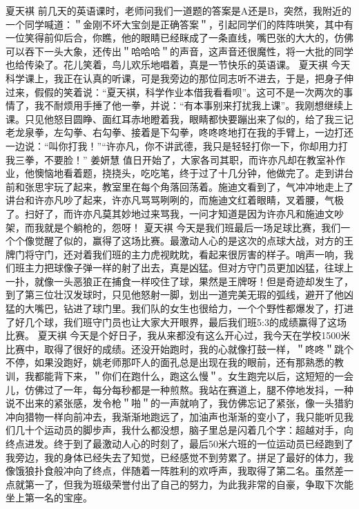 {}夏天褀\markdownRendererInterblockSeparator
{}前几天的英语课时，老师问我们一道题的答案是A还是B，突然，我附近的一个同学喊道：＂金刚不坏大宝剑是正确答案＂，引起同学们的阵阵哄笑，其中有一位笑得前仰后合，你瞧，他的眼睛已经眯成了一条直线，嘴巴张的大大的，仿佛可以吞下一头大象，还传出＂哈哈哈＂的声音，这声音还很魔性，将一大批的同学也给传染了。花儿笑着，鸟儿欢乐地唱着，真是一节快乐的英语课。\markdownRendererInterblockSeparator
{}\markdownRendererInterblockSeparator
{}夏天褀\markdownRendererInterblockSeparator
{}今天科学课上，我正在认真的听课，可是我旁边的那位同志听不进去，于是，把身子伸过来，假假的笑着说：“夏天褀，科学作业本借我看看呗”。这可不是一次两次的事情了，我不耐烦用手捶了他一拳，并说：“有本事别来打扰我上课”。我刚想继续上课。只见他怒目圆睁、面红耳赤地瞪着我，眼睛都快要蹦出来了似的，给了我三记老龙泉拳，左勾拳、右勾拳、接着是下勾拳，咚咚咚地打在我的手臂上，一边打还一边说：“叫你打我！”“许亦凡，你不讲武德，我只是轻轻打你一下，你却用力打我三拳，不要脸！”\markdownRendererInterblockSeparator
{}\markdownRendererInterblockSeparator
{}姜妍慧\markdownRendererInterblockSeparator
{}值日开始了，大家各司其职，而许亦凡却在教室补作业，他懊恼地看着题，挠挠头，吃吃笔，终于过了十几分钟，他做完了。走到讲台前和张思宇玩了起来，教室里在每个角落回荡着。施迪文看到了，气冲冲地走上了讲台和许亦凡吵了起来，许亦凡骂骂咧咧的，而施迪文红着眼睛，叉着腰，气极了。扫好了，而许亦凡莫其妙地过来骂我，一问才知道是因为许亦凡和施迪文吵架，而我就是个躺枪的，怨呀！\markdownRendererInterblockSeparator
{}\markdownRendererInterblockSeparator
{}夏天褀\markdownRendererInterblockSeparator
{}今天是我们班最后一场足球比赛，我们一个个像觉醒了似的，赢得了这场比赛。最激动人心的是这次的点球大战，对方的王牌门将守门，还对着我们班的主力虎视眈眈，看起来很厉害的样子。哨声一响，我们班主力把球像子弹一样的射了出去，真是凶猛。但对方守门员更加凶猛，往球上一扑，就像一头恶狼正在捕食一样咬住了球，果然是王牌呀！但是奇迹却发生了，到了第三位壮汉发球时，只见他怒射一脚，划出一道完美无瑕的弧线，避开了他凶猛的大嘴巴，钻进了球门里。我们队的女生也很给力，一个个野性都爆发了，打进了好几个球，我们班守门员也让大家大开眼界，最后我们班5:3的成绩赢得了这场比赛。\markdownRendererInterblockSeparator
{}\markdownRendererInterblockSeparator
{}夏天褀\markdownRendererInterblockSeparator
{}今天是个好日子，我从来都没有这么开心过，我今天在学校1500米比赛中，取得了很好的成绩。还没开始跑时，我的心就像打鼓一样，＂咚咚＂跳个不停，如果没跑好，姚老师那吓人的面孔总是出现在我的眼前，还有那熟悉的教训，我都能背下来，＂你们在跑什么，跑这么慢＂。女生跑完以后，这短短的一会儿，仿佛过了一年，每分每秒都是一种煎熬。我站在赛道上，腿不停地发抖，一种说不出来的紧张感，发令枪＂啪＂的一声就响了，我仿佛忘记了紧张，像一头猎豹冲向猎物一样向前冲去，我渐渐地跑远了，加油声也渐渐的变小了，我只能听见我们几十个运动员的脚步声，我什么都没想，脑子里总是闪着几个字：超越对手，向终点进发。终于到了最激动人心的时刻了，最后50米六班的一位运动员已经跑到了我旁边，我的身体已经失去了知觉，已经感觉不到劳累了。拼足了最好的体力，我像饿狼扑食般冲向了终点，伴随着一阵胜利的欢呼声，我取得了第二名。虽然差一点就第一了，但我为班级荣誉付出了自己的努力，为此我非常的自豪，争取下次能坐上第一名的宝座。\markdownRendererInterblockSeparator
